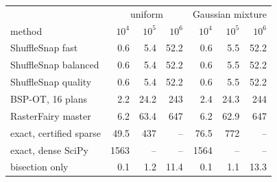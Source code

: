 \begin{tabular}{lrrrrrr}
\toprule
 & \multicolumn{3}{c}{uniform} & \multicolumn{3}{c}{Gaussian mixture} \\
method & $10^4$ & $10^5$ & $10^6$ & $10^4$ & $10^5$ & $10^6$ \\
\midrule
ShuffleSnap fast & 0.6 & 5.4 & 52.2 & 0.6 & 5.5 & 52.2 \\
ShuffleSnap balanced & 0.6 & 5.4 & 52.2 & 0.6 & 5.5 & 52.2 \\
ShuffleSnap quality & 0.6 & 5.4 & 52.2 & 0.6 & 5.5 & 52.2 \\
BSP-OT, 16 plans & 2.2 & 24.2 & 243 & 2.4 & 24.3 & 244 \\
RasterFairy master & 6.2 & 63.4 & 647 & 6.2 & 62.9 & 647 \\
exact, certified sparse & 49.5 & 437 & -- & 76.5 & 772 & -- \\
exact, dense SciPy & 1563 & -- & -- & 1564 & -- & -- \\
bisection only & 0.1 & 1.2 & 11.4 & 0.1 & 1.1 & 13.3 \\
\bottomrule
\end{tabular}
